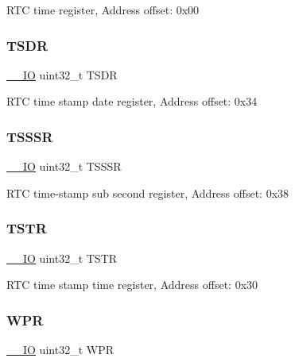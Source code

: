 R\+TC time register, Address offset\+: 0x00 \mbox{\label{struct_r_t_c___type_def_abeb6fb580a8fd128182aa9ba2738ac2c}} 
\subsubsection{\texorpdfstring{T\+S\+DR}{TSDR}}
{\footnotesize\ttfamily \hyperlink{core__sc300_8h_aec43007d9998a0a0e01faede4133d6be}{\+\_\+\+\_\+\+IO} uint32\+\_\+t T\+S\+DR}

R\+TC time stamp date register, Address offset\+: 0x34 \mbox{\label{struct_r_t_c___type_def_a1d6c2bc4c067d6a64ef30d16a5925796}} 
\subsubsection{\texorpdfstring{T\+S\+S\+SR}{TSSSR}}
{\footnotesize\ttfamily \hyperlink{core__sc300_8h_aec43007d9998a0a0e01faede4133d6be}{\+\_\+\+\_\+\+IO} uint32\+\_\+t T\+S\+S\+SR}

R\+TC time-\/stamp sub second register, Address offset\+: 0x38 \mbox{\label{struct_r_t_c___type_def_a042059c8b4168681d6aecf30211dd7b8}} 
\subsubsection{\texorpdfstring{T\+S\+TR}{TSTR}}
{\footnotesize\ttfamily \hyperlink{core__sc300_8h_aec43007d9998a0a0e01faede4133d6be}{\+\_\+\+\_\+\+IO} uint32\+\_\+t T\+S\+TR}

R\+TC time stamp time register, Address offset\+: 0x30 \mbox{\label{struct_r_t_c___type_def_a6204786b050eb135fabb15784698e86e}} 
\subsubsection{\texorpdfstring{W\+PR}{WPR}}
{\footnotesize\ttfamily \hyperlink{core__sc300_8h_aec43007d9998a0a0e01faede4133d6be}{\+\_\+\+\_\+\+IO} uint32\+\_\+t W\+PR}

